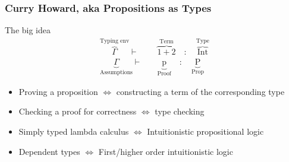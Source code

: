 \documentclass{beamer}
\begin{document}
\begin{frame}[fragile]
  \frametitle{Curry Howard, aka Propositions as Types}

  \begin{block} {The big idea}
    \begin{align*}
      \overbrace{\Gamma}^{\text{Typing env}} \vdash  \quad & \overbrace{1 + 2}^{\text{Term}} \quad : \quad \overbrace{\text{Int}}^{\text{Type}} \\
      \underbrace{\Gamma}_{\text{Assumptions}} \vdash \quad & \underbrace{\text{p}}_{\text{Proof}} \quad : \quad \underbrace{\text{P}}_{\text{Prop}}
    \end{align*}
    \begin{itemize}[label=$\ast$]
      \item Proving a proposition $\Longleftrightarrow$ constructing a term of the
        corresponding type
      \item Checking a proof for correctness $\Longleftrightarrow$ type checking
      \item Simply typed lambda calculus $\Longleftrightarrow$ Intuitionistic propositional logic
      \item Dependent types $\Longleftrightarrow$ First/higher order intuitionistic logic  
    \end{itemize}
  \end{block}
\end{frame}
\end{document}
